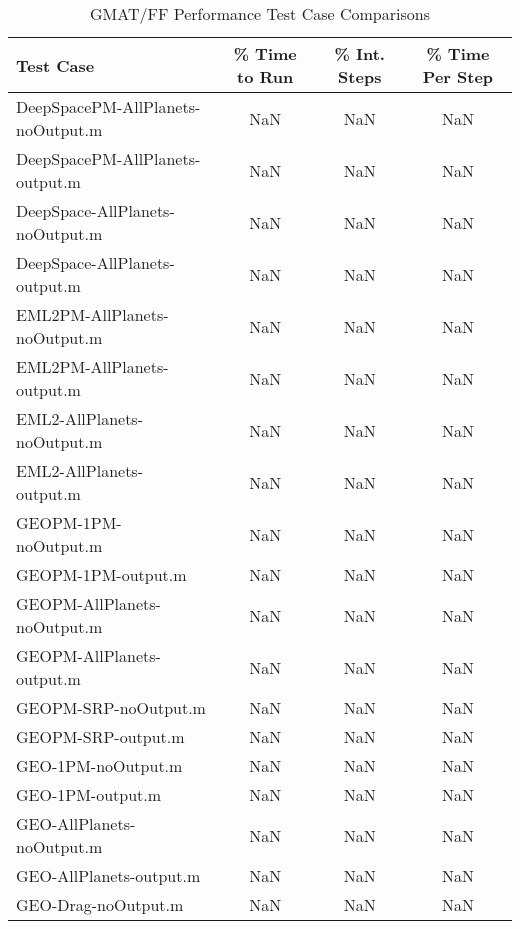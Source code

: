 \begin{table}[htbp!]
\centering
\caption{ GMAT/FF Performance Test Case Comparisons}
      \begin{tabular}{lccc}
      \hline\hline
          Test Case & \% Time to Run & \% Int. Steps & \% Time Per Step \\
         \hline
         DeepSpacePM-AllPlanets-noOutput.m & NaN & NaN & NaN \\
         DeepSpacePM-AllPlanets-output.m & NaN & NaN & NaN \\
         DeepSpace-AllPlanets-noOutput.m & NaN & NaN & NaN \\
         DeepSpace-AllPlanets-output.m & NaN & NaN & NaN \\
         EML2PM-AllPlanets-noOutput.m & NaN & NaN & NaN \\
         EML2PM-AllPlanets-output.m & NaN & NaN & NaN \\
         EML2-AllPlanets-noOutput.m & NaN & NaN & NaN \\
         EML2-AllPlanets-output.m & NaN & NaN & NaN \\
         GEOPM-1PM-noOutput.m & NaN & NaN & NaN \\
         GEOPM-1PM-output.m & NaN & NaN & NaN \\
         GEOPM-AllPlanets-noOutput.m & NaN & NaN & NaN \\
         GEOPM-AllPlanets-output.m & NaN & NaN & NaN \\
         GEOPM-SRP-noOutput.m & NaN & NaN & NaN \\
         GEOPM-SRP-output.m & NaN & NaN & NaN \\
         GEO-1PM-noOutput.m & NaN & NaN & NaN \\
         GEO-1PM-output.m & NaN & NaN & NaN \\
         GEO-AllPlanets-noOutput.m & NaN & NaN & NaN \\
         GEO-AllPlanets-output.m & NaN & NaN & NaN \\
         GEO-Drag-noOutput.m & NaN & NaN & NaN \\

\end{tabular}
\end{table}
